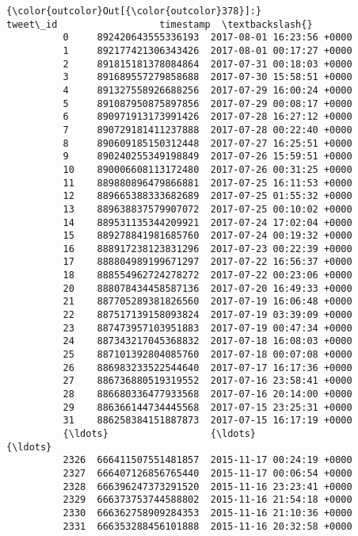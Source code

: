 \documentclass[11pt]{article}
\begin{document}
\begin{Verbatim}[commandchars=\\\{\}]
{\color{outcolor}Out[{\color{outcolor}378}]:}                 tweet\_id                  timestamp  \textbackslash{}
          0     892420643555336193  2017-08-01 16:23:56 +0000   
          1     892177421306343426  2017-08-01 00:17:27 +0000   
          2     891815181378084864  2017-07-31 00:18:03 +0000   
          3     891689557279858688  2017-07-30 15:58:51 +0000   
          4     891327558926688256  2017-07-29 16:00:24 +0000   
          5     891087950875897856  2017-07-29 00:08:17 +0000   
          6     890971913173991426  2017-07-28 16:27:12 +0000   
          7     890729181411237888  2017-07-28 00:22:40 +0000   
          8     890609185150312448  2017-07-27 16:25:51 +0000   
          9     890240255349198849  2017-07-26 15:59:51 +0000   
          10    890006608113172480  2017-07-26 00:31:25 +0000   
          11    889880896479866881  2017-07-25 16:11:53 +0000   
          12    889665388333682689  2017-07-25 01:55:32 +0000   
          13    889638837579907072  2017-07-25 00:10:02 +0000   
          14    889531135344209921  2017-07-24 17:02:04 +0000   
          15    889278841981685760  2017-07-24 00:19:32 +0000   
          16    888917238123831296  2017-07-23 00:22:39 +0000   
          17    888804989199671297  2017-07-22 16:56:37 +0000   
          18    888554962724278272  2017-07-22 00:23:06 +0000   
          20    888078434458587136  2017-07-20 16:49:33 +0000   
          21    887705289381826560  2017-07-19 16:06:48 +0000   
          22    887517139158093824  2017-07-19 03:39:09 +0000   
          23    887473957103951883  2017-07-19 00:47:34 +0000   
          24    887343217045368832  2017-07-18 16:08:03 +0000   
          25    887101392804085760  2017-07-18 00:07:08 +0000   
          26    886983233522544640  2017-07-17 16:17:36 +0000   
          27    886736880519319552  2017-07-16 23:58:41 +0000   
          28    886680336477933568  2017-07-16 20:14:00 +0000   
          29    886366144734445568  2017-07-15 23:25:31 +0000   
          31    886258384151887873  2017-07-15 16:17:19 +0000   
          {\ldots}                  {\ldots}                        {\ldots}   
          2326  666411507551481857  2015-11-17 00:24:19 +0000   
          2327  666407126856765440  2015-11-17 00:06:54 +0000   
          2328  666396247373291520  2015-11-16 23:23:41 +0000   
          2329  666373753744588802  2015-11-16 21:54:18 +0000   
          2330  666362758909284353  2015-11-16 21:10:36 +0000   
          2331  666353288456101888  2015-11-16 20:32:58 +0000   

\end{Verbatim}
\end{document}
